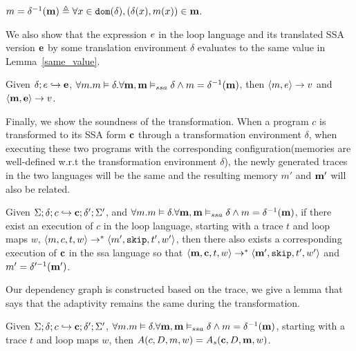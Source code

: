 \begin{defn}
 $m = \delta^{-1}({\bf{{m}}}) \triangleq \forall x \in \mathtt{dom}(\delta), (\delta(x), m(x)) \in {\bf{{m}}} $.
\end{defn}

We also show that the expression $e$ in the {loop} language and its translated SSA version ${\bf{{e}}}$ by some translation environment $\delta$ evaluates to the same value in Lemma~\ref{same_value}. 
%
\begin{lem}
\label{same_value}
Given $\delta; e \hookrightarrow {\bf{{e}}}$,  $\forall m. m \vDash \delta. \forall {\bf{{m}}}, {\bf{{m}}} \vDash_{ssa} \delta \land m = \delta^{-1}({\bf{{m}}})$, then $\langle m, e \rangle \to v $ and $\langle 
{\bf{{m}}}, {\bf{{e}}} \rangle \to {v}$.  
\end{lem}

Finally, we show the soundness of the transformation. When a program $c$ is transformed to its SSA form ${\bf{{c}}}$ through a transformation environment $\delta$, when executing these two programs with the corresponding configuration(memories are well-defined w.r.t the transformation environment $\delta$), the newly generated traces in the two languages will be the same and the resulting memory $m'$ and ${\bf{{m'}}}$ will also be related. 

\begin{thm}
\label{thm:sound_trans}
Given $\Sigma; \delta ; c \hookrightarrow {\bf{{c}}} ; \delta';\Sigma' $, and $\forall m. m \vDash \delta. \\ \forall {\bf{{m}}}, {\bf{{m}}} \vDash_{ssa} \delta \land m = \delta^{-1}({\bf{{m}}})$, if there exist an execution of $c$ in the { loop} language, starting with a trace $t$ and loop maps $w$, $\langle m, c, t, w \rangle \to^{*} \langle m', \mathtt{skip}, t', w'  \rangle $,  then there also exists a corresponding execution of ${\bf{{c}}}$ in the ssa language so that 
  $\langle   {{\bf{{m}}}}, {\bf{{c}}}, t, w \rangle \to^{*} \langle {  {\bf{{m'}}}}, \mathtt{skip}, t', w'  \rangle $ and $ m' = \delta'^{-1}({\bf{{m'}}}) $.
\end{thm}

Our dependency graph is constructed based on the trace, we give a lemma that says that the adaptivity remains the same during the transformation.
\begin{lem}
\label{lem:same_adapt}
Given $\Sigma; \delta ; c \hookrightarrow {\bf{{c}}} ; \delta';\Sigma' $, $\forall m. m \vDash \delta. \forall {\bf{{m}}}, {\bf{{m}}} \vDash_{ssa} \delta \land m = \delta^{-1}({\bf{{m}}})$, starting with a trace $t$ and loop maps $w$, then $A(c,D,m,w) = A_s({\bf{{c}}},D,{\bf{{m}}},w) $.
\end{lem}




